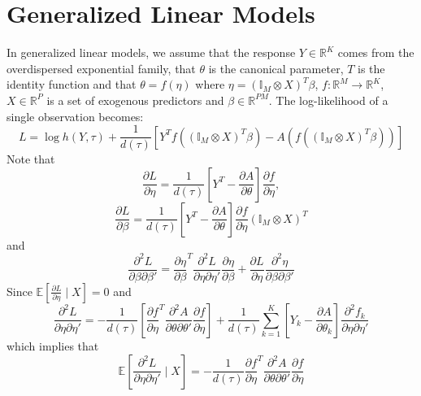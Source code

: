 \documentclass[11pt]{article}
\begin{document}
\section{Generalized Linear Models}
In generalized linear models, we assume that the response $Y \in \mathbb{R}^K$ comes from the overdispersed exponential family, that $\theta$ is the canonical parameter, $T$ is the identity function and that $\theta = f \left( \eta \right)$ where $\eta = \left( \mathbb{I}_M \otimes X \right)^T \beta$, $f: \mathbb{R}^M \rightarrow \mathbb{R}^K$, $X \in \mathbb{R}^P$ is a set of exogenous predictors and $\beta \in \mathbb{R}^{PM}$. The log-likelihood of a single observation becomes:
\begin{equation}
L = \log h \left( Y , \tau \right) + \frac{1}{d \left( \tau \right)} \left[
Y^T f \left( \left( \mathbb{I}_M \otimes X \right)^T \beta \right) - A \left( f \left( \left( \mathbb{I}_M \otimes X \right)^T \beta \right) \right)
\right]
\end{equation}
Note that
\begin{equation}
\frac{\partial L}{\partial \eta} = \frac{1}{d \left( \tau \right)} \left[ Y^T - \frac{\partial A}{\partial \theta} \right] \frac{\partial f}{\partial \eta},
\end{equation}
\begin{equation}
\frac{\partial L}{\partial \beta} = \frac{1}{d \left( \tau \right)} \left[ Y^T - \frac{\partial A}{\partial \theta} \right] \frac{\partial f}{\partial \eta} \left( \mathbb{I}_M \otimes X \right)^T
\end{equation}
and
\begin{equation}
\frac{\partial^2 L}{\partial \beta \partial \beta'} = \frac{\partial \eta}{\partial \beta}^T
\frac{\partial^2 L}{\partial \eta \partial \eta'} \frac{\partial \eta}{\partial \beta} +
\frac{\partial L}{\partial \eta} \frac{\partial^2 \eta}{\partial \beta \partial \beta'}
\end{equation}
Since $\mathbb{E} \left[ \frac{\partial L}{\partial \eta} \mid X \right] = 0$ and
\begin{equation}
\frac{\partial^2 L}{\partial \eta \partial \eta'} = -\frac{1}{d \left( \tau \right)} \left[
\frac{\partial f}{\partial \eta}^T \frac{\partial^2 A}{\partial \theta \partial \theta'} \frac{\partial f}{\partial \eta}
\right] +
\frac{1}{d \left( \tau \right)} \sum_{k=1}^K \left[ Y_k - \frac{\partial A}{\partial \theta_k} \right] \frac{\partial^2 f_k}{\partial \eta \partial \eta'}
\end{equation}
which implies that
\begin{equation}
\mathbb{E} \left[ \frac{\partial^2 L}{\partial \eta \partial \eta'} \mid X \right] = -\frac{1}{d \left( \tau \right)}
\frac{\partial f}{\partial \eta}^T \frac{\partial^2 A}{\partial \theta \partial \theta'} \frac{\partial f}{\partial \eta}
\end{equation}
\end{document}
